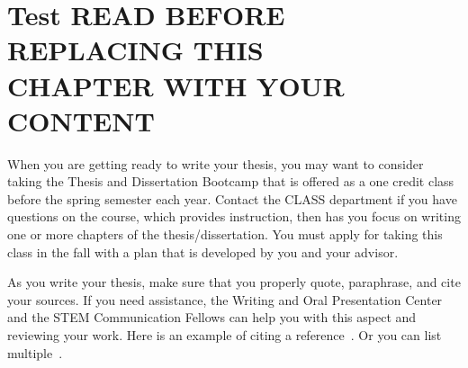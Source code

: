 \documentclass[12pt]{report}
\begin{document}
% 
%
\signaturepage
\chapter{Test READ BEFORE REPLACING THIS\protect\\ CHAPTER WITH YOUR CONTENT}
When you are getting ready to write your thesis, you may want to consider taking the Thesis and Dissertation Bootcamp that is offered as a one credit class before the spring semester each year. Contact the CLASS department if you have questions on the course, which provides instruction, then has you focus on writing one or more chapters of the thesis/dissertation. You must apply for taking this class in the fall with a plan that is developed by you and your advisor.

As you write your thesis, make sure that you properly quote, paraphrase, and cite your sources. If you need assistance, the Writing and Oral Presentation Center and the STEM Communication Fellows can help you with this aspect and reviewing your work. Here is an example of citing a reference~\cite{Brown1997}. Or you can list multiple~\cite{ElSheimy2008,El-Diasty2009}.
\end{document}
